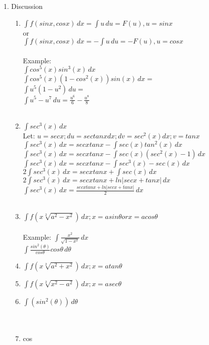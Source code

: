 \documentclass{article}
\begin{document}
\begin{enumerate}
    \item Discussion
    \begin{enumerate}
        \item $\int f(sinx,cosx) \,dx = \int u \,du = F(u), u = sinx$\\or\\
        $\int f(sinx,cosx) \,dx = -\int u \,du = -F(u), u = cosx$ 
        \\\\Example:\\
        $\int {cos^5(x)sin^3(x)} \,dx $\\
        $\int {cos^5(x)(1-cos^2(x))sin(x)} \,dx = $\\
        $\int {u^5(1-u^2)} \,du = $\\
        $\int {u^5-u^7} \,du = {\frac{u^6}{6}-\frac{u^8}{8}}$\\\\
        \item $\int {sec^3(x)} \,dx $\\
        Let: $u=secx;du=sectanxdx;dv=sec^2(x)dx;v=tanx$\\
        $\int {sec^3(x)} \,dx = secxtanx - \int {sec(x)tan^2(x)} \,dx $\\
        $\int {sec^3(x)} \,dx = secxtanx - \int {sec(x)(sec^2(x)-1)} \,dx $\\
        $\int {sec^3(x)} \,dx = secxtanx - \int {sec^3(x)-sec(x)} \,dx $\\
        $2\int {sec^3(x)} \,dx = secxtanx + \int {sec(x)} \,dx $\\
        $2\int {sec^3(x)} \,dx = secxtanx + ln|secx+tanx| \,dx $\\
        $\int {sec^3(x)} \,dx = \frac{secxtanx + ln|secx+tanx|}{2} \,dx $\\\\
        \item $\int f(x\sqrt[2]{a^2-x^2}) \,dx; x=asin\theta or x=acos\theta$\\\\
        Example: $\int {\frac{x^2}{\sqrt{1-x^2}}} \,dx$\\
        $\int {\frac{sin^2(\theta)}{cos\theta}cos\theta} \,d\theta$\\

        \item $\int f(x\sqrt[2]{a^2+x^2}) \,dx; x=atan\theta$\\
        \item $\int f(x\sqrt[2]{x^2-a^2}) \,dx; x=asec\theta$\\
        \item $\int(sin^2(\theta)) \,d\theta$\\\\\\
        \item cos
        

\end{enumerate}
\end{enumerate}
\end{document}
